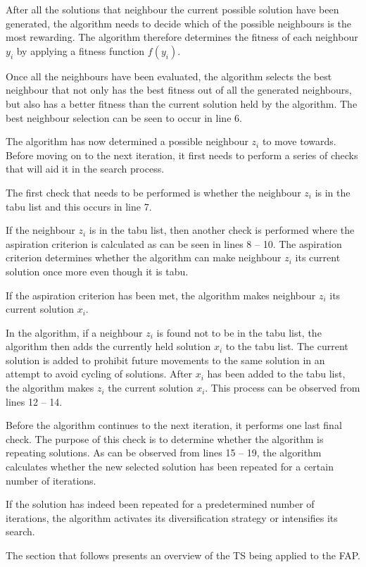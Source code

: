 After all the solutions that neighbour the current possible solution have been generated, the algorithm needs to decide which of the possible neighbours is the most rewarding. The algorithm therefore determines the fitness of each neighbour $y_i$ by applying a fitness function $f(y_i)$. 

Once all the neighbours have been evaluated, the algorithm selects the best neighbour that not only has the best fitness out of all the generated neighbours, but also has a better fitness than the current solution held by the algorithm. The best neighbour selection can be seen to occur in line 6.

The algorithm has now determined a possible neighbour $z_i$ to move towards. Before moving on to the next iteration, it first needs to perform a series of checks that will aid it in the search process.

The first check that needs to be performed is whether the neighbour $z_i$ is in the tabu list and this occurs in line 7. 

If the neighbour $z_i$ is in the tabu list, then another check is performed where the aspiration criterion is calculated as can be seen in lines 8 -- 10. The aspiration criterion determines whether the algorithm can make neighbour $z_i$ its current solution once more even though it is tabu. 

If the aspiration criterion has been met, the algorithm makes neighbour $z_i$ its current solution $x_i$. 

In the algorithm, if a neighbour $z_i$ is found not to be in the tabu list, the algorithm then adds the currently held solution $x_i$ to the tabu list. The current solution is added to prohibit future movements to the same solution in an attempt to avoid cycling of solutions. After $x_i$ has been added to the tabu list, the algorithm makes $z_i$ the current solution $x_i$. This process can be observed from lines 12 -- 14.

Before the algorithm continues to the next iteration, it performs one last final check. The purpose of this check is to determine whether the algorithm is repeating solutions. As can be observed from lines 15 -- 19, the algorithm calculates whether the new selected solution has been repeated for a certain number of iterations. 

If the solution has indeed been repeated for a predetermined number of iterations, the algorithm activates its diversification strategy or intensifies its search.

The section that follows presents an overview of the TS being applied to the FAP.
